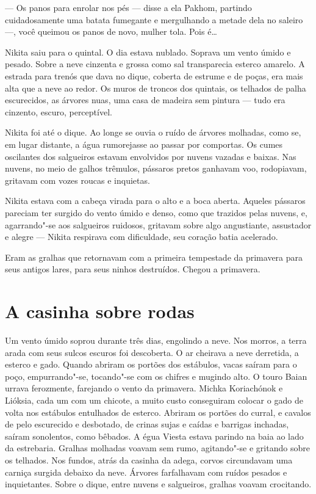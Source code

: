 --- Os panos para enrolar nos pés --- disse a ela Pakhom, partindo
cuidadosamente uma batata fumegante e mergulhando a metade dela no
saleiro ---, você queimou os panos de novo, mulher tola. Pois é\ldots{}

Nikita saiu para o quintal. O dia estava nublado. Soprava um vento úmido
e pesado. Sobre a neve cinzenta e grossa como sal transparecia esterco
amarelo. A estrada para trenós que dava no dique, coberta de estrume e de
poças, era mais alta que a neve ao redor. Os muros de troncos dos
quintais, os telhados de palha escurecidos, as árvores nuas, uma casa de
madeira sem pintura --- tudo era cinzento, escuro, perceptível.

Nikita foi até o dique. Ao longe se ouvia o ruído de árvores molhadas,
como se, em lugar distante, a água rumorejasse ao passar por comportas.
Os cumes oscilantes dos salgueiros estavam envolvidos por nuvens vazadas
e baixas. Nas nuvens, no meio de galhos trêmulos, pássaros pretos
ganhavam voo, rodopiavam, gritavam com vozes roucas e inquietas.

Nikita estava com a cabeça virada para o alto e a boca aberta. Aqueles
pássaros pareciam ter surgido do vento úmido e denso, como que trazidos
pelas nuvens, e, agarrando"-se aos salgueiros ruidosos, gritavam sobre
algo angustiante, assustador e alegre --- Nikita respirava com
dificuldade, seu coração batia acelerado.

Eram as gralhas que retornavam com a primeira tempestade da primavera
para seus antigos lares, para seus ninhos destruídos. Chegou a
primavera.

\chapter{A casinha sobre rodas}

Um vento úmido soprou durante três dias, engolindo a neve. Nos morros, a
terra arada com seus sulcos escuros foi descoberta. O ar cheirava a neve
derretida, a esterco e gado. Quando abriram os portões dos estábulos,
vacas saíram para o poço, empurrando"-se, tocando"-se com os chifres e
mugindo alto. O touro Baian urrava ferozmente, farejando o vento da
primavera. Michka Koriachónok e Lióksia, cada um com um chicote, a muito
custo conseguiram colocar o gado de volta nos estábulos entulhados de
esterco. Abriram os portões do curral, e cavalos de pelo escurecido e
desbotado, de crinas sujas e caídas e barrigas inchadas, saíram
sonolentos, como bêbados. A égua Viesta estava parindo na baia ao lado
da estrebaria. Gralhas molhadas voavam sem rumo, agitando"-se e gritando
sobre os telhados. Nos fundos, atrás da casinha da adega, corvos
circundavam uma carniça surgida debaixo da neve. Árvores farfalhavam com
ruídos pesados e inquietantes. Sobre o dique, entre nuvens e salgueiros,
gralhas voavam crocitando.

